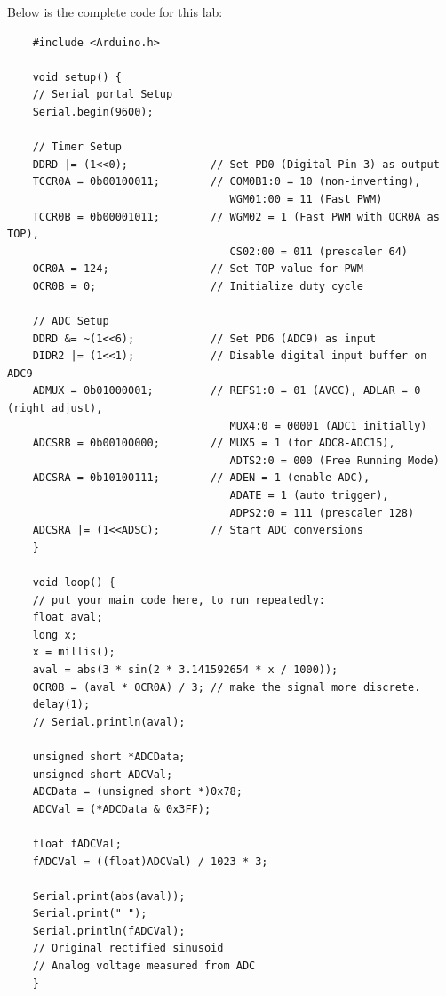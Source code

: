 \documentclass{report}
\begin{document}
    Below is the complete code for this lab:
    \begin{verbatim}
    #include <Arduino.h>

    void setup() {
    // Serial portal Setup
    Serial.begin(9600);

    // Timer Setup
    DDRD |= (1<<0);             // Set PD0 (Digital Pin 3) as output
    TCCR0A = 0b00100011;        // COM0B1:0 = 10 (non-inverting), 
                                   WGM01:00 = 11 (Fast PWM)
    TCCR0B = 0b00001011;        // WGM02 = 1 (Fast PWM with OCR0A as TOP), 
                                   CS02:00 = 011 (prescaler 64)
    OCR0A = 124;                // Set TOP value for PWM
    OCR0B = 0;                  // Initialize duty cycle

    // ADC Setup
    DDRD &= ~(1<<6);            // Set PD6 (ADC9) as input
    DIDR2 |= (1<<1);            // Disable digital input buffer on ADC9
    ADMUX = 0b01000001;         // REFS1:0 = 01 (AVCC), ADLAR = 0 (right adjust), 
                                   MUX4:0 = 00001 (ADC1 initially)
    ADCSRB = 0b00100000;        // MUX5 = 1 (for ADC8-ADC15), 
                                   ADTS2:0 = 000 (Free Running Mode)
    ADCSRA = 0b10100111;        // ADEN = 1 (enable ADC), 
                                   ADATE = 1 (auto trigger), 
                                   ADPS2:0 = 111 (prescaler 128)
    ADCSRA |= (1<<ADSC);        // Start ADC conversions
    }

    void loop() {
    // put your main code here, to run repeatedly:
    float aval;
    long x;
    x = millis();
    aval = abs(3 * sin(2 * 3.141592654 * x / 1000));
    OCR0B = (aval * OCR0A) / 3; // make the signal more discrete. 
    delay(1);
    // Serial.println(aval);

    unsigned short *ADCData;
    unsigned short ADCVal;
    ADCData = (unsigned short *)0x78;
    ADCVal = (*ADCData & 0x3FF);

    float fADCVal;
    fADCVal = ((float)ADCVal) / 1023 * 3;

    Serial.print(abs(aval));
    Serial.print(" ");
    Serial.println(fADCVal);
    // Original rectified sinusoid
    // Analog voltage measured from ADC
    }

    \end{verbatim}
\end{document}
